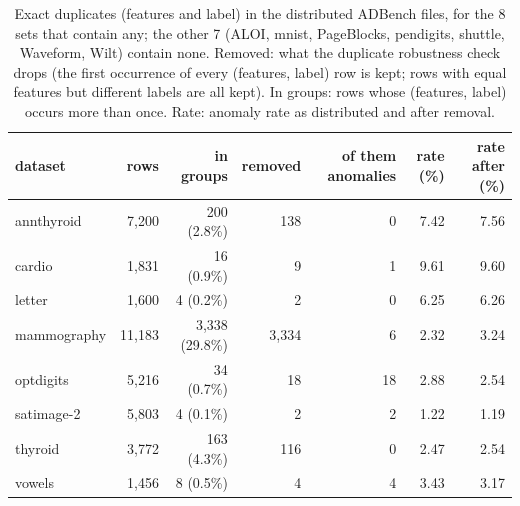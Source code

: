 \begin{table}[t]
\centering
\small
\setlength{\tabcolsep}{5pt}
\caption{Exact duplicates (features and label) in the distributed ADBench files, for the 8 sets that contain any; the other 7 (ALOI, mnist, PageBlocks, pendigits, shuttle, Waveform, Wilt) contain none. Removed: what the duplicate robustness check drops (the first occurrence of every (features, label) row is kept; rows with equal features but different labels are all kept). In groups: rows whose (features, label) occurs more than once. Rate: anomaly rate as distributed and after removal.}
\label{tab:setup-duplicates}
\begin{tabular}{lrrrrrr}
\toprule
dataset & rows & in groups & removed & of them anomalies & rate (\%) & rate after (\%) \\
\midrule
annthyroid & 7,200 & 200 (2.8\%) & 138 & 0 & 7.42 & 7.56 \\
cardio & 1,831 & 16 (0.9\%) & 9 & 1 & 9.61 & 9.60 \\
letter & 1,600 & 4 (0.2\%) & 2 & 0 & 6.25 & 6.26 \\
mammography & 11,183 & 3,338 (29.8\%) & 3,334 & 6 & 2.32 & 3.24 \\
optdigits & 5,216 & 34 (0.7\%) & 18 & 18 & 2.88 & 2.54 \\
satimage-2 & 5,803 & 4 (0.1\%) & 2 & 2 & 1.22 & 1.19 \\
thyroid & 3,772 & 163 (4.3\%) & 116 & 0 & 2.47 & 2.54 \\
vowels & 1,456 & 8 (0.5\%) & 4 & 4 & 3.43 & 3.17 \\
\bottomrule
\end{tabular}
\end{table}
